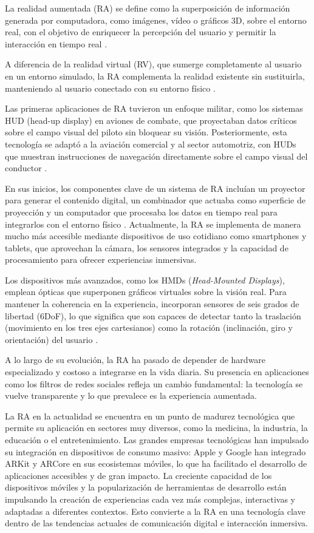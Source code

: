 La realidad aumentada (RA) se define como la superposición de información generada por computadora, como imágenes, vídeo o gráficos 3D, sobre el entorno real, con el objetivo de enriquecer la percepción del usuario y permitir la interacción en tiempo real \citep{Azuma1997}.  

A diferencia de la realidad virtual (RV), que sumerge completamente al usuario en un entorno simulado, la RA complementa la realidad existente sin sustituirla, manteniendo al usuario conectado con su entorno físico \citep{Billinghurst2015}.  

Las primeras aplicaciones de RA tuvieron un enfoque militar, como los sistemas HUD (head-up display) en aviones de combate, que proyectaban datos críticos sobre el campo visual del piloto sin bloquear su visión. Posteriormente, esta tecnología se adaptó a la aviación comercial y al sector automotriz, con HUDs que muestran instrucciones de navegación directamente sobre el campo visual del conductor \citep{Olsson2012}.  

En sus inicios, los componentes clave de un sistema de RA incluían un proyector para generar el contenido digital, un combinador que actuaba como superficie de proyección y un computador que procesaba los datos en tiempo real para integrarlos con el entorno físico \citep{Azuma1997}. Actualmente, la RA se implementa de manera mucho más accesible mediante dispositivos de uso cotidiano como smartphones y tablets, que aprovechan la cámara, los sensores integrados y la capacidad de procesamiento para ofrecer experiencias inmersivas.  

Los dispositivos más avanzados, como los HMDs (\textit{Head-Mounted Displays}), emplean ópticas que superponen gráficos virtuales sobre la visión real. Para mantener la coherencia en la experiencia, incorporan sensores de seis grados de libertad (6DoF), lo que significa que son capaces de detectar tanto la traslación (movimiento en los tres ejes cartesianos) como la rotación (inclinación, giro y orientación) del usuario \citep{AzumaBishop1994}.  

A lo largo de su evolución, la RA ha pasado de depender de hardware especializado y costoso a integrarse en la vida diaria. Su presencia en aplicaciones como los filtros de redes sociales refleja un cambio fundamental: la tecnología se vuelve transparente y lo que prevalece es la experiencia aumentada.  

La RA en la actualidad se encuentra en un punto de madurez tecnológica que permite su aplicación en sectores muy diversos, como la medicina, la industria, la educación o el entretenimiento. Las grandes empresas tecnológicas han impulsado su integración en dispositivos de consumo masivo: Apple y Google han integrado ARKit \citep{ARKit} y ARCore \citep{ARCore} en sus ecosistemas móviles, lo que ha facilitado el desarrollo de aplicaciones accesibles y de gran impacto. La creciente capacidad de los dispositivos móviles y la popularización de herramientas de desarrollo están impulsando la creación de experiencias cada vez más complejas, interactivas y adaptadas a diferentes contextos. Esto convierte a la RA en una tecnología clave dentro de las tendencias actuales de comunicación digital e interacción inmersiva.

